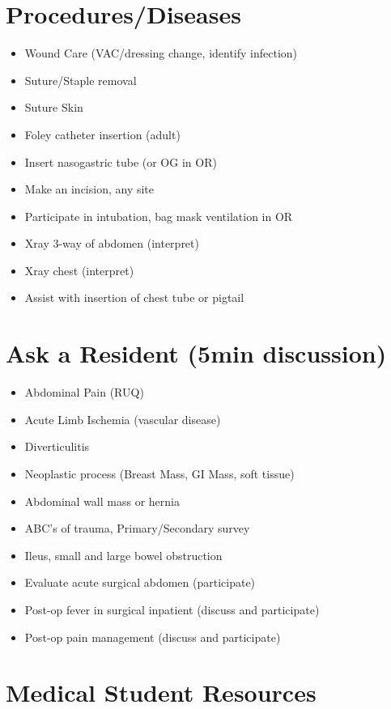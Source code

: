 \documentclass[
  letterpaper,
]{scrbook}
\providecommand{\tightlist}{%
  \setlength{\itemsep}{0pt}\setlength{\parskip}{0pt}}
\begin{document}
\section{Procedures/Diseases}\label{proceduresdiseases}

\begin{itemize}
\tightlist
\item
  Wound Care (VAC/dressing change, identify infection)
\item
  Suture/Staple removal
\item
  Suture Skin
\item
  Foley catheter insertion (adult)
\item
  Insert nasogastric tube (or OG in OR)
\item
  Make an incision, any site
\item
  Participate in intubation, bag mask ventilation in OR
\item
  Xray 3-way of abdomen (interpret)
\item
  Xray chest (interpret)
\item
  Assist with insertion of chest tube or pigtail
\end{itemize}

\section{Ask a Resident (5min
discussion)}\label{ask-a-resident-5min-discussion}

\begin{itemize}
\tightlist
\item
  Abdominal Pain (RUQ)
\item
  Acute Limb Ischemia (vascular disease)
\item
  Diverticulitis
\item
  Neoplastic process (Breast Mass, GI Mass, soft tissue)
\item
  Abdominal wall mass or hernia
\item
  ABC's of trauma, Primary/Secondary survey
\item
  Ileus, small and large bowel obstruction
\item
  Evaluate acute surgical abdomen (participate)
\item
  Post-op fever in surgical inpatient (discuss and participate)
\item
  Post-op pain management (discuss and participate)
\end{itemize}

\section{Medical Student Resources}\label{medical-student-resources}
\end{document}
